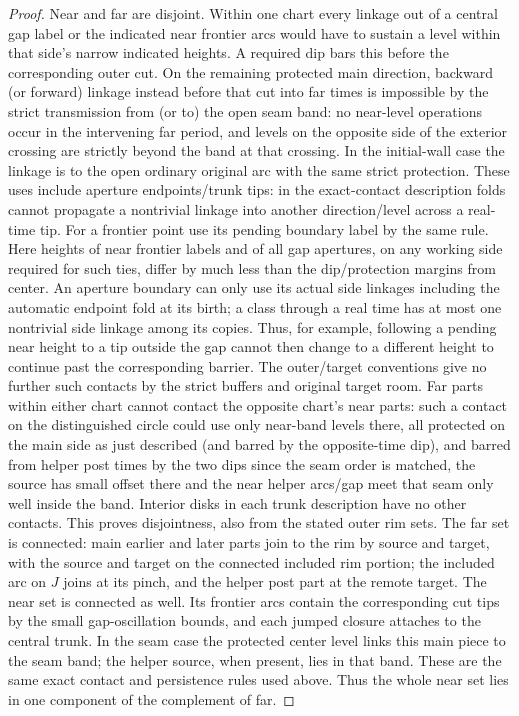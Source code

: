 \begin{proof}
Near and far are disjoint. Within one chart every linkage out of a central gap label or
the indicated near frontier arcs would have to sustain a level within that side's narrow
indicated heights. A required dip bars this before the corresponding outer cut. On the
remaining protected main direction, backward (or forward) linkage instead before that cut
into far times is impossible by the strict transmission from (or to) the open seam band:
no near-level operations occur in the intervening far period, and levels on the opposite
side of the exterior crossing are strictly beyond the band at that crossing. In the
initial-wall case the linkage is to the open ordinary original arc with the same strict
protection. These uses include aperture endpoints/trunk tips: in the exact-contact
description folds cannot propagate a nontrivial linkage into another direction/level
across a real-time tip. For a frontier point use its pending boundary label by the same
rule. Here heights of near frontier labels and of all gap apertures, on any working side
required for such ties, differ by much less than the dip/protection margins from center.
An aperture boundary can only use its actual side linkages including the automatic
endpoint fold at its birth; a class through a real time has at most one nontrivial side
linkage among its copies. Thus, for example, following a pending near height to a tip
outside the gap cannot then change to a different height to continue past the
corresponding barrier. The outer/target conventions give no further such contacts by the
strict buffers and original target room. Far parts within either chart cannot contact the
opposite chart's near parts: such a contact on the distinguished circle could use only
near-band levels there, all protected on the main side as just described (and barred by
the opposite-time dip), and barred from helper post times by the two dips since the seam
order is matched, the source has small offset there and the near helper arcs/gap meet that
seam only well inside the band. Interior disks in each trunk description have no other
contacts. This proves disjointness, also from the stated outer rim sets. The far set is
connected: main earlier and later parts join to the rim by source and target, with the
source and target on the connected included rim portion; the included arc on \(J\) joins
at its pinch, and the helper post part at the remote target. The near set is connected as well. Its frontier arcs contain the
corresponding cut tips by the small gap-oscillation bounds, and each
jumped closure attaches to the central trunk. In the seam case the
protected center level links this main piece to the seam band; the
helper source, when present, lies in that band. These are the same exact
contact and persistence rules used above. Thus the whole near set lies
in one component of the complement of far.


\end{proof}
